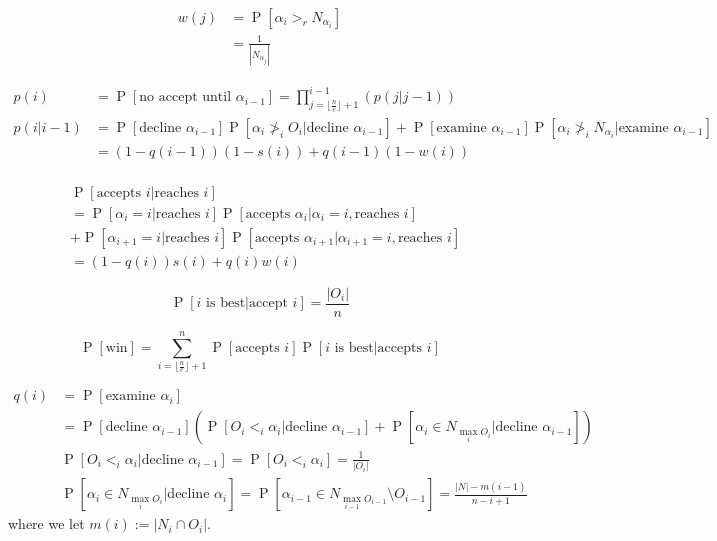 \documentclass{article}
\newcommand{\oP}{\operatorname{P}}
\newcommand{\gt}{>}
\begin{document}
\begin{align*}
w(j) &= \oP[\alpha_i \gt_r N_{\alpha_i}]\\
&= \frac{1}{|N_{\alpha_j}|}
\end{align*}


\begin{align*}
p(i) &= \oP[\text{no accept until }\alpha_{i-1}]=\prod_{j=\lfloor\frac{n}{e}\rfloor + 1}^{i-1} \left( p(j|j-1) \right)\\
p(i|i-1) &= \oP[\text{decline }\alpha_{i-1}]\oP[\alpha_i \not >_i O_i | \text{decline }\alpha_{i-1}] + \oP[\text{examine }\alpha_{i-1}]\oP[\alpha_{i} \not >_i N_{\alpha_i} | \text{examine }\alpha_{i-1}]\\
&= \left( 1-q(i-1) \right)(1-s(i)) + q(i-1)(1-w(i))\\
\end{align*}





\begin{align*}
	&\oP[\text{accepts } i | \text{reaches }i] \\&= 
	\oP[\alpha_i = i | \text{reaches }i] 
	\oP[\text{accepts }\alpha_i | \alpha_i = i, \text{reaches }i]
	\\&+
	\oP[\alpha_{i+1} = i | \text{reaches }i]
	\oP[\text{accepts }\alpha_{i+1} | \alpha_{i+1} = i, \text{reaches }i]\\
	&= (1-q(i))s(i) + q(i) w(i)
\end{align*}

\begin{equation*}
\oP[i \text{ is best}|\text{accept }i] = \frac{|O_i|}{n}
\end{equation*}

\begin{equation*}
	\oP[\text{win}] = \sum_{i=\lfloor\frac{n}{e}\rfloor+1}^n
	\oP[\text{accepts } i ]\oP[i\text{ is best} | \text{accepts } i ]
\end{equation*}



\begin{align*}
q(i) &= \oP[\text{examine }\alpha_i]\\
&= \oP[\text{decline }\alpha_{i-1}]\left(\oP[O_i <_i \alpha_i |\text{decline }\alpha_{i-1}]+\oP[\alpha_i \in N_{\max_i O_i}|\text{decline }\alpha_{i-1}]\right)\\
&\oP[O_i <_i \alpha_i |\text{decline }\alpha_{i-1}] = \oP[O_i <_i \alpha_i] = \frac{1}{|O_i|}\\
&\oP[\alpha_i \in N_{\max_i O_i}|\text{decline }\alpha_{i}] = \oP[\alpha_{i-1} \in N_{\max_{i-1} O_{i-1}}\setminus O_{i-1}] = \frac{|N|-m(i-1)}{n-i+1}
\end{align*}
where we let $m(i):=|N_i\cap O_i|$.
\end{document}
